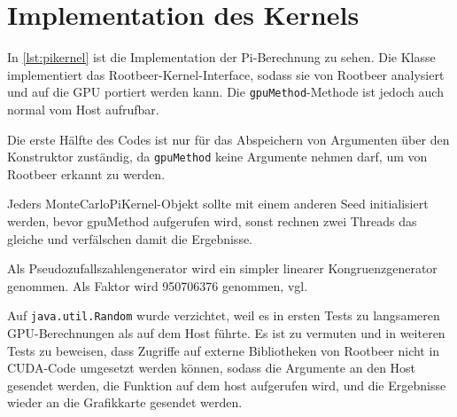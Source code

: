 \section{Implementation des Kernels}

In \autoref{lst:pikernel} ist die Implementation der Pi-Berechnung zu sehen.
Die Klasse implementiert das Rootbeer-Kernel-Interface, sodass sie von Rootbeer analysiert und auf die GPU portiert werden kann.
Die \lstinline!gpuMethod!-Methode ist jedoch auch normal vom Host aufrufbar.

Die erste Hälfte des Codes ist nur für das Abspeichern von Argumenten über den Konstruktor zuständig, da \lstinline!gpuMethod! keine Argumente nehmen darf, um von Rootbeer erkannt zu werden.

Jeders MonteCarloPiKernel-Objekt sollte mit einem anderen Seed initialisiert werden, bevor gpuMethod aufgerufen wird, sonst rechnen zwei Threads das gleiche und verfälschen damit die Ergebnisse.

Als Pseudozufallszahlengenerator wird ein simpler linearer Kongruenzgenerator genommen. Als Faktor wird 950706376 genommen, vgl. \cite{fishman82,fishman86}

Auf \lstinline!java.util.Random! wurde verzichtet, weil es in ersten Tests zu langsameren GPU-Berechnungen als auf dem Host führte. Es ist zu vermuten und in weiteren Tests zu beweisen, dass Zugriffe auf externe Bibliotheken von Rootbeer nicht in CUDA-Code umgesetzt werden können, sodass die Argumente an den Host gesendet werden, die Funktion auf dem host aufgerufen wird, und die Ergebnisse wieder an die Grafikkarte gesendet werden.

